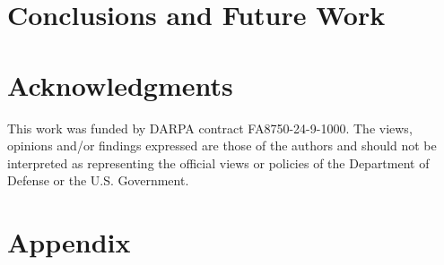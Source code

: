 \documentclass{llncs}
\begin{document}
\section{Conclusions and Future Work}
\label{sec:conclusions}


\section*{Acknowledgments}
This work was funded by DARPA contract FA8750-24-9-1000. The views, opinions and/or findings expressed are those of the authors and should not be interpreted as representing the official views or policies of the Department of Defense or the U.S. Government.



\appendix
\section{Appendix}
\label{appendix:test-scenarios}

\end{document}
